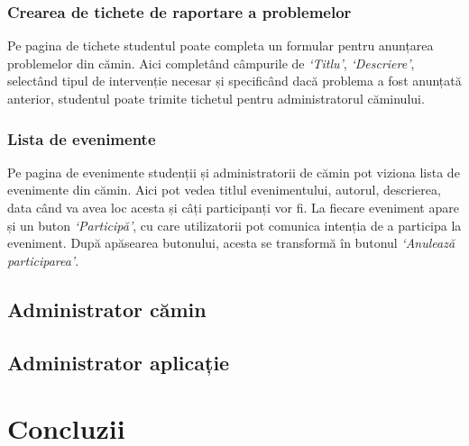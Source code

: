 \documentclass[12pt,a4paper]{report}
\theoremstyle{definition}
\theoremstyle{remark}
\begin{document}
\subsection{Crearea de tichete de raportare a problemelor}

\par Pe pagina de tichete studentul poate completa un formular pentru anunțarea problemelor din cămin. Aici completând câmpurile de \textit{`Titlu'}, \textit{`Descriere'}, selectând tipul de intervenție necesar și specificând dacă problema a fost anunțată anterior, studentul poate trimite tichetul pentru administratorul căminului.


\subsection{Lista de evenimente}

\par Pe pagina de evenimente studenții și administratorii de cămin pot viziona lista de evenimente din cămin. Aici pot vedea titlul evenimentului, autorul, descrierea, data când va avea loc acesta și câți participanți vor fi. La fiecare eveniment apare și un buton \textit{`Participă'}, cu care utilizatorii pot comunica intenția de a participa la eveniment. După apăsearea butonului, acesta se transformă în butonul \textit{`Anulează participarea'}.


\section{Administrator cămin}
\section{Administrator aplicație}

\chapter{Concluzii}
\section{}



\end{document}
